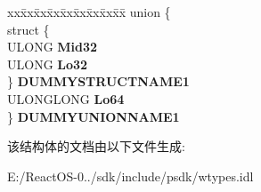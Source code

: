 \begin{DoxyCompactItemize}
\begin{tabbing}
\end{tabbing}\item 
\mbox{\label{struct_i_win_types_1_1tag_d_e_c_ae07ab3324708bff99073293e1f5c3a13}} 
\begin{tabbing}
xx\=xx\=xx\=xx\=xx\=xx\=xx\=xx\=xx\=\kill
union \{\\
\>struct \{\\
\>\>ULONG {\bfseries Mid32}\\
\>\>ULONG {\bfseries Lo32}\\
\>\} {\bfseries DUMMYSTRUCTNAME1}\\
\>ULONGLONG {\bfseries Lo64}\\
\} {\bfseries DUMMYUNIONNAME1}\\

\end{tabbing}\end{DoxyCompactItemize}


该结构体的文档由以下文件生成\+:\begin{DoxyCompactItemize}
\item 
E\+:/\+React\+O\+S-\/0../sdk/include/psdk/wtypes.\+idl\end{DoxyCompactItemize}

